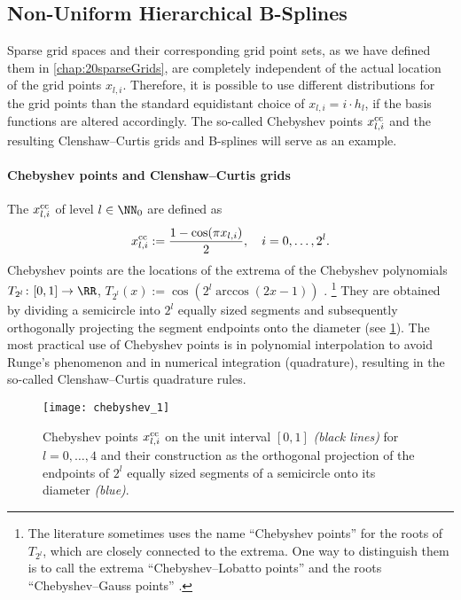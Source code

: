 \subsection{Non-Uniform Hierarchical B-Splines}

Sparse grid spaces and their corresponding grid point sets,
as we have defined them in \cref{chap:20sparseGrids},
are completely independent of the actual location of the grid points
$x_{l,i}$.
Therefore, it is possible to use different distributions for the grid points
than the standard equidistant choice of $x_{l,i} = i \cdot h_l$,
if the basis functions are altered accordingly.
The so-called Chebyshev points $x_{l,i}^{\mathrm{cc}}$ and the
resulting Clenshaw--Curtis grids and B-splines will serve as an example.

\paragraph{Chebyshev points and Clenshaw--Curtis grids}

%
The  $x_{l,i}^{\mathrm{cc}}$ of level $l \in \NN_0$
are defined as
\begin{equation}
  x_{l,i}^{\mathrm{cc}}
  := \frac{1 - \cos(\pi x_{l,i})}{2},\quad
  i = 0, \dotsc, 2^l.
\end{equation}
Chebyshev points are the locations of the extrema of the
Chebyshev polynomials $T_{2^l}\colon [0, 1] \to \RR$,
$T_{2^l}(x) := \cos(2^l \arccos(2x - 1))$ \cite{Xu16Chebyshev}.%
\footnote{%
  The literature sometimes uses the name ``Chebyshev points'' for
  the roots of $T_{2^l}$, which are closely connected to the extrema.
  One way to distinguish them is to call the extrema
  ``Chebyshev--Lobatto points'' and the roots
  ``Chebyshev--Gauss points'' \cite{Xu16Chebyshev}.%
}
They are obtained by dividing a semicircle into $2^l$ equally sized
segments and subsequently orthogonally projecting the
segment endpoints onto the diameter
(see \cref{fig:chebyshev}).
The most practical use of Chebyshev points is in
polynomial interpolation to avoid Runge's phenomenon and in
numerical integration (quadrature), resulting in the
so-called Clenshaw--Curtis quadrature rules.

\begin{figure}
  \texttt{[image: chebyshev\_1]}%
  \caption{%
    Chebyshev points $x_{l,i}^{\mathrm{cc}}$ on the unit interval $[0, 1]$
    \emph{(black lines)}
    for $l = 0, \dotsc, 4$
    and their construction as the orthogonal projection of the
    endpoints of $2^l$ equally sized segments
    of a semicircle onto its diameter \emph{\textcolor{C0}{(blue)}}.%
  }
  \label{fig:chebyshev}
\end{figure}

